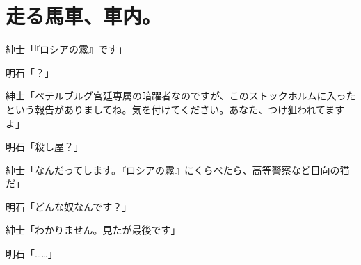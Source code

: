 \section*{走る馬車、車内。}

紳士「『ロシアの霧』です」

明石「？」

紳士「ペテルブルグ宮廷専属の暗躍者なのですが、このストックホルムに入ったという報告がありましてね。気を付けてください。あなた、つけ狙われてますよ」

明石「殺し屋？」

紳士「なんだってします。『ロシアの霧』にくらべたら、高等警察など日向の猫だ」

明石「どんな奴なんです？」

紳士「わかりません。見たが最後です」

明石「……」

